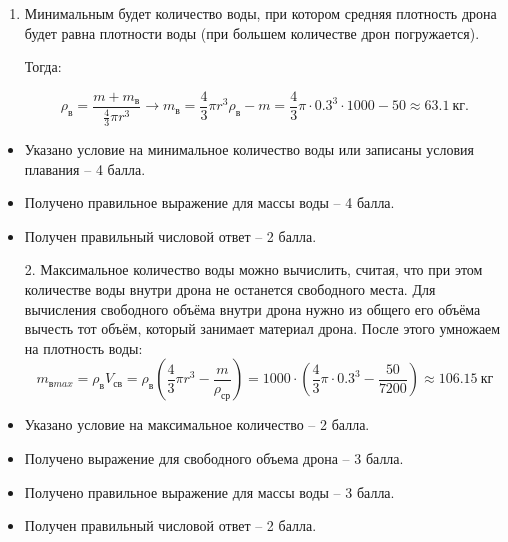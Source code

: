 \solutionSection

\begin{enumerate}
    \item Минимальным будет количество воды, при котором 
    средняя плотность дрона будет равна плотности воды 
    (при большем количестве дрон погружается). 

    Тогда:
    
    $$\rho_\text{в}=\frac{m+m_\text{в}}{\frac{4}{3} \pi r^3} \rightarrow  m_\text{в}= \frac{4}{3} \pi r^3 \rho_\text{в}-m=\frac{4}{3} \pi  \cdot 0.3^3 \cdot 1000-50 \approx 63.1 \: \text{кг} .$$  

\end{enumerate}

\additionalCriteria

\begin{itemize}
    \item Указано условие на минимальное количество воды или записаны условия плавания – 4 балла.
    \item Получено правильное выражение для массы воды – 4 балла.
    \item Получен правильный числовой ответ – 2 балла.
\end{itemize}

\begin{enumerate}
    \item[2.] Максимальное количество воды можно вычислить, 
    считая, что при этом количестве воды внутри дрона не 
    останется свободного места. Для вычисления свободного 
    объёма внутри дрона нужно из общего его объёма вычесть 
    тот объём, который занимает материал дрона. После этого 
    умножаем на плотность воды:
    $$m_{\text{в}max}=\rho_\text{в} V_\text{св}=\rho_\text{в} \left(\frac{4}{3} \pi r^3-\frac{m}{\rho_\text{ср}} \right)=1000 \cdot \left(\frac{4}{3} \pi \cdot 0.3^3-\frac{50}{7200}\right) \approx 106.15 \: \text{кг}$$   

\end{enumerate}

\additionalCriteria

\begin{itemize}
    \item Указано условие на максимальное количество – 2 балла.
    \item Получено выражение для свободного объема дрона – 3 балла.
    \item Получено правильное выражение для массы воды – 3 балла.
    \item Получен правильный числовой ответ – 2 балла.
\end{itemize}

